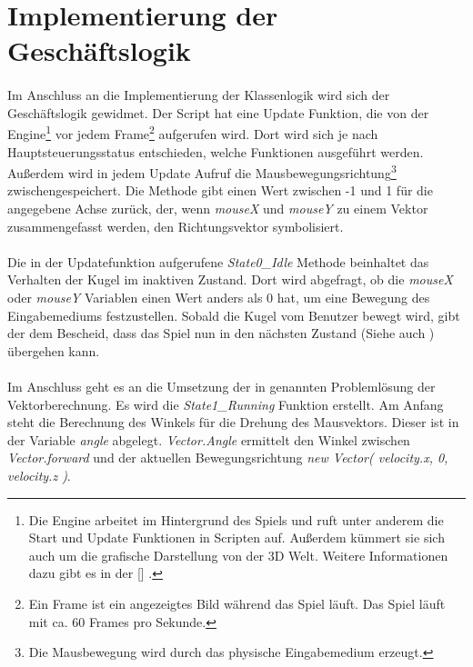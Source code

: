 

\section{Implementierung der Geschäftslogik}
\paragraph{}
Im Anschluss an die Implementierung der Klassenlogik wird sich der Geschäftslogik gewidmet. Der  Script hat eine Update Funktion, die von der Engine\footnote{Die Engine arbeitet im Hintergrund des Spiels und ruft unter anderem die Start und Update Funktionen in Scripten auf. Außerdem kümmert sie sich auch um die grafische Darstellung von der 3D Welt. Weitere Informationen dazu gibt es in der  [] \cite{Engine}.} vor jedem Frame\footnote{Ein Frame ist ein angezeigtes Bild während das Spiel läuft. Das Spiel läuft mit ca. 60 Frames pro Sekunde.} aufgerufen wird. Dort wird sich je nach Hauptsteuerungsstatus entschieden, welche Funktionen ausgeführt werden. Außerdem wird in jedem Update Aufruf die Mausbewegungsrichtung\footnote{Die Mausbewegung wird durch das physische Eingabemedium erzeugt.} zwischengespeichert. Die Methode  gibt einen Wert zwischen -1 und 1 für die angegebene Achse zurück, der, wenn \textit{mouseX} und \textit{mouseY} zu einem Vektor zusammengefasst werden, den Richtungsvektor symbolisiert.



\paragraph{}
Die in der Updatefunktion aufgerufene \textit{State0{\_}Idle} Methode beinhaltet das Verhalten der Kugel im inaktiven Zustand. Dort wird abgefragt, ob die \textit{mouseX} oder \textit{mouseY} Variablen einen Wert anders als 0 hat, um eine Bewegung des Eingabemediums festzustellen. Sobald die Kugel vom Benutzer bewegt wird, gibt der  dem  Bescheid, dass das Spiel nun in den nächsten Zustand (Siehe auch ) übergehen kann.



\paragraph{}
Im Anschluss geht es an die Umsetzung der in  genannten Problemlösung der Vektorberechnung. Es wird die \textit{State1{\_}Running} Funktion erstellt. Am Anfang steht die Berechnung des Winkels für die Drehung des Mausvektors. Dieser ist in der Variable \textit{angle} abgelegt. \textit{Vector.Angle} ermittelt den Winkel zwischen \textit{Vector.forward} und der aktuellen Bewegungsrichtung \textit{new Vector( velocity.x, 0, velocity.z )}.

